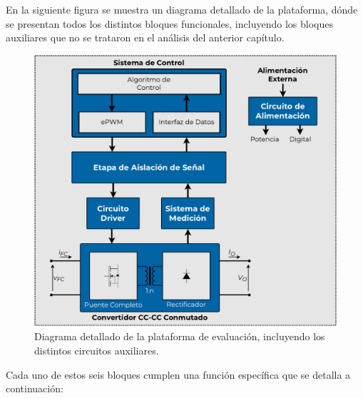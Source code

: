 En la siguiente figura se muestra un diagrama detallado de la plataforma, dónde se presentan todos los distintos bloques funcionales, incluyendo los bloques auxiliares que no se trataron en el análisis del anterior capítulo.\\

\begin{figure}[h]
    \centering
    \includegraphics[scale=0.43]{Imagenes/Plataforma Detallada.pdf}
    \caption{Diagrama detallado de la plataforma de evaluación, incluyendo los distintos circuitos auxiliares.}
    \label{diag_detallado}
\end{figure}

Cada uno de estos seis bloques cumplen una función específica que se detalla a continuación:\\

